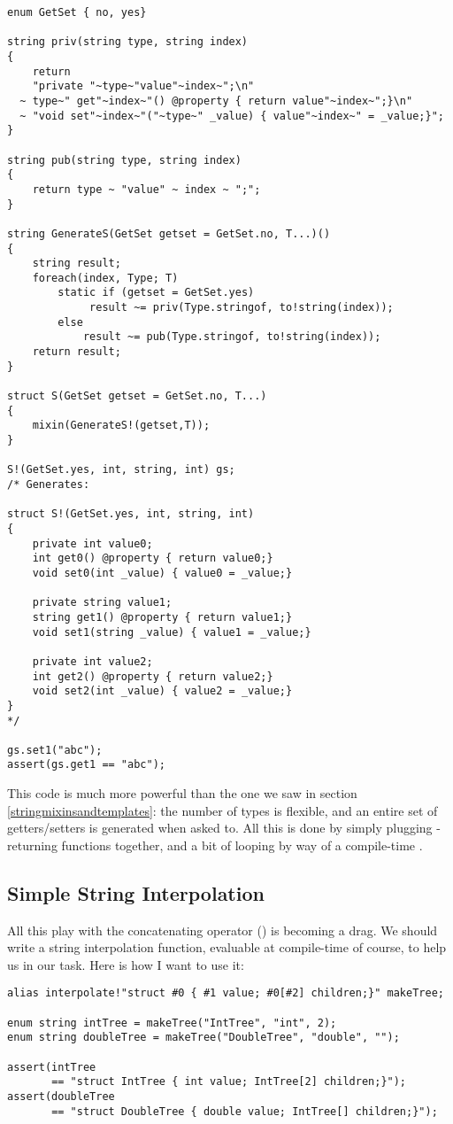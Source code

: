\begin{verbatim}
enum GetSet { no, yes}

string priv(string type, string index)
{
    return 
    "private "~type~"value"~index~";\n"
  ~ type~" get"~index~"() @property { return value"~index~";}\n"
  ~ "void set"~index~"("~type~" _value) { value"~index~" = _value;}";
}   

string pub(string type, string index)
{
    return type ~ "value" ~ index ~ ";";
}

string GenerateS(GetSet getset = GetSet.no, T...)()
{
    string result;    
    foreach(index, Type; T)
        static if (getset = GetSet.yes)
		     result ~= priv(Type.stringof, to!string(index));
        else
            result ~= pub(Type.stringof, to!string(index));
    return result;
}

struct S(GetSet getset = GetSet.no, T...)
{
    mixin(GenerateS!(getset,T));
}

S!(GetSet.yes, int, string, int) gs;
/* Generates:

struct S!(GetSet.yes, int, string, int)
{
    private int value0;
    int get0() @property { return value0;}
    void set0(int _value) { value0 = _value;}

    private string value1;
    string get1() @property { return value1;}
    void set1(string _value) { value1 = _value;}

    private int value2;
    int get2() @property { return value2;}
    void set2(int _value) { value2 = _value;}
}
*/

gs.set1("abc");
assert(gs.get1 == "abc");
\end{verbatim}

This code is much more powerful than the one we saw in section \ref{stringmixinsandtemplates}: the number of types is flexible, and an entire set of getters/setters is generated when asked to. All this is done by simply plugging -returning functions together, and a bit of looping by way of a compile-time .

\subsection{Simple String Interpolation}

All this play with the concatenating operator (\DD{\~}) is becoming a drag. We should write a string interpolation function, evaluable at compile-time of course, to help us in our task. Here is how I want to use it:

\begin{verbatim}
alias interpolate!"struct #0 { #1 value; #0[#2] children;}" makeTree;

enum string intTree = makeTree("IntTree", "int", 2);
enum string doubleTree = makeTree("DoubleTree", "double", "");

assert(intTree 
       == "struct IntTree { int value; IntTree[2] children;}");
assert(doubleTree 
       == "struct DoubleTree { double value; IntTree[] children;}");
\end{verbatim}

